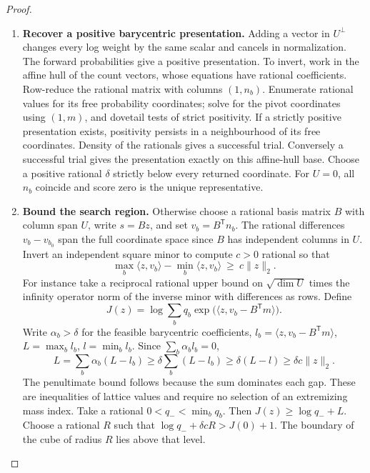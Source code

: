 \documentclass[11pt,a4paper]{article}
\theoremstyle{definition}
\theoremstyle{remark}\newaliascnt{remark}{theorem}
\numberwithin{equation}{section}
\begin{document}
\begin{proof}\leavevmode
\begin{enumerate}[titledsteps]
    \item \textbf{Recover a positive barycentric presentation.} Adding a vector in $U^\perp$ changes every log weight by the same scalar and cancels in normalization. The forward probabilities give a positive presentation. To invert, work in the affine hull of the count vectors, whose equations have rational coefficients. Row-reduce the rational matrix with columns $(1,n_b)$. Enumerate rational values for its free probability coordinates; solve for the pivot coordinates using $(1,m)$, and dovetail tests of strict positivity. If a strictly positive presentation exists, positivity persists in a neighbourhood of its free coordinates. Density of the rationals gives a successful trial. Conversely a successful trial gives the presentation exactly on this affine-hull base. Choose a positive rational $\delta$ strictly below every returned coordinate. For $U=0$, all $n_b$ coincide and score zero is the unique representative.


    \item \textbf{Bound the search region.} Otherwise choose a rational basis matrix $B$ with column span $U$, write $s=Bz$, and set $v_b=B^{\mathsf{T}} n_b$. The rational differences $v_b-v_{b_0}$ span the full coordinate space since $B$ has independent columns in $U$. Invert an independent square minor to compute $c>0$ rational so that
\[
 \max_b \langle z,v_b\rangle-\min_b\langle z,v_b\rangle
      \ \ge\ c\|z\|_2 .
\]
For instance take a reciprocal rational upper bound on $\sqrt{\dim U}$ times the infinity operator norm of the inverse minor with differences as rows. Define
\[
 J(z)=\log\sum_b q_b\exp\big(\langle z,v_b-B^{\mathsf{T}}m\rangle\big).
\]
Write \(\alpha_b> \delta\) for the feasible barycentric coefficients, \(l_b=\langle z,v_b-B^{\mathsf T}m\rangle\), \(L=\max_b l_b\), \(l=\min_b l_b\). Since \(\sum_b\alpha_b l_b=0\),
\[
 L=\sum_b\alpha_b(L-l_b)\ge\delta\sum_b(L-l_b)
       \ge\delta(L-l)\ge\delta c\|z\|_2 .
\]
The penultimate bound follows because the sum dominates each gap. These are inequalities of lattice values and require no selection of an extremizing mass index. Take a rational \(0<q_-<\min_bq_b\). Then \(J(z)\ge\log q_-+L\). Choose a rational \(R\) such that \(\log q_-+\delta cR>J(0)+1\). The boundary of the cube of radius \(R\) lies above that level.



\end{enumerate}
\end{proof}
\end{document}
